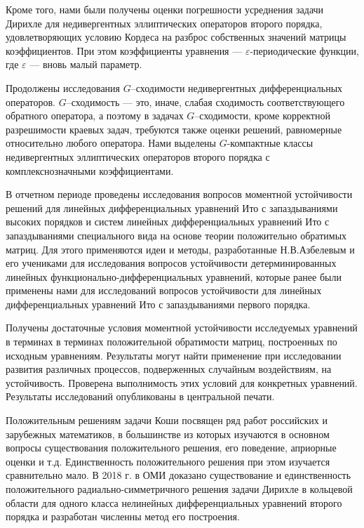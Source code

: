 Кроме того, нами были получены оценки погрешности усреднения задачи Дирихле для недивергентных эллиптических операторов второго порядка, удовлетворяющих условию Кордеса на разброс собственных значений матрицы коэффициентов. При этом коэффициенты уравнения --- $\varepsilon$-периодические функции, где $\varepsilon$ --- вновь малый параметр.




Продолжены исследования  $G$--сходимости недивергентных дифференциальных операторов. $G$--сходимость --- это, иначе, слабая сходимость
соответствующего обратного оператора, а поэтому в задачах $G$--сходимости, кроме корректной разрешимости краевых задач, требуются также оценки решений,
равномерные относительно любого оператора. Нами выделены $G$-компактные классы недивергентных эллиптических операторов второго порядка с комплекснозначными коэффициентами.







В отчетном периоде проведены исследования вопросов моментной устойчивости решений для линейных дифференциальных уравнений Ито с
запаздываниями высоких порядков и систем линейных дифференциальных уравнений Ито с запаздываниями специального вида на
основе теории положительно обратимых матриц. Для этого применяются идеи и методы, разработанные Н.В.Азбелевым и его
учениками для исследования вопросов устойчивости детерминированных линейных функционально-дифференциальных уравнений,
которые ранее были применены нами для исследований вопросов устойчивости для линейных дифференциальных уравнений Ито с
запаздываниями первого порядка.

Получены достаточные условия моментной устойчивости исследуемых уравнений в терминах в терминах положительной обратимости матриц, построенных по исходным уравнениям.
Результаты могут найти применение при исследовании развития различных процессов, подверженных случайным воздействиям, на  устойчивость.
Проверена выполнимость этих условий для конкретных уравнений.
Результаты исследований опубликованы в центральной печати.









Положительным решениям задачи Коши посвящен ряд
работ российских и зарубежных математиков, в большинстве из которых изучаются в основном
вопросы существования положительного решения, его поведение,
априорные оценки и т.д.
Единственность положительного решения при этом изучается сравнительно мало.
В 2018 г. в ОМИ доказано существование и единственность положительного радиально-симметричного решения задачи Дирихле в кольцевой
области для одного класса нелинейных дифференциальных уравнений второго порядка и разработан численны метод его построения.






